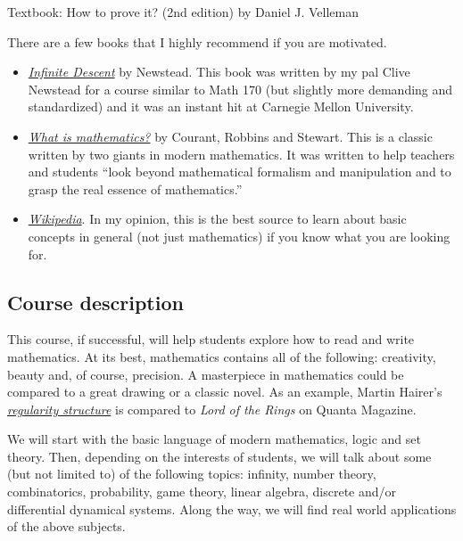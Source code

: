 \documentclass[
]{article}
\begin{document}
Textbook: How to prove it? (2nd edition) by Daniel J. Velleman

There are a few books that I highly recommend if you are motivated.

\begin{itemize}
\item
  \href{https://infinitedescent.xyz/}{\emph{Infinite Descent}} by Newstead. This book was written
  by my pal Clive Newstead for a course similar to Math 170 (but slightly more demanding and standardized) and it was an instant hit at Carnegie Mellon University.
\item
  \href{https://www.amazon.com/Mathematics-Elementary-Approach-Ideas-Methods/dp/0195105192}{\emph{What is mathematics?}} by Courant, Robbins and Stewart. This is a classic written
  by two giants in modern mathematics.
  It was written to help teachers and students ``look beyond mathematical formalism and manipulation and to grasp
  the real essence of mathematics.''
\item
  \href{https://en.wikipedia.org}{\emph{Wikipedia}}. In my opinion, this is the best source
  to learn about basic concepts in general (not just mathematics) if you know what
  you are looking for.
\end{itemize}

\hypertarget{course-description}{%
\subsection*{Course description}\label{course-description}}

This course, if successful, will help students explore how to read and write mathematics.
At its best, mathematics contains all of the following: creativity, beauty and, of course, precision.
A masterpiece in mathematics could be compared to a great drawing or a classic novel.
As an example, Martin Hairer's \href{https://www.quantamagazine.org/hearing-music-in-noise-martin-hairer-wins-the-fields-medal-20140812}{\emph{regularity structure}} is compared to \emph{Lord of the Rings}
on Quanta Magazine.

We will start with the basic language of modern mathematics, logic and set theory.
Then, depending on the interests of students, we will talk about some (but not limited to) of the following topics: infinity, number theory, combinatorics, probability, game theory,
linear algebra, discrete and/or differential dynamical systems.
Along the way, we will find real world applications of the above subjects.
\end{document}
